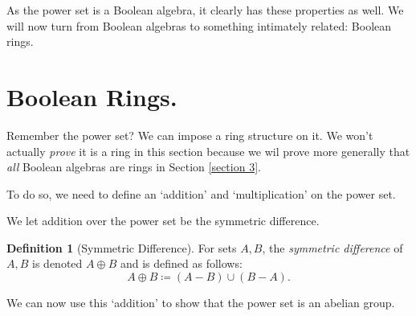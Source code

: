 \documentclass[10pt, letterpaper]{article}
\newcommand{\union}{\cup}
\newcommand{\intersect}{\cap}
\theoremstyle{definition}
\newtheorem{definition}{Definition}[section]
\begin{document}
As the power set is a Boolean algebra, it clearly has these properties as well.
We will now turn from Boolean algebras to something intimately related: Boolean rings.

\section{Boolean Rings.}

Remember the power set? We can impose a ring structure on it. 
We won't actually \textit{prove} it is a ring in this section
because we wil prove more generally that \textit{all} Boolean algebras
are rings in Section \ref{section 3}.

To do so, we need to define an `addition' and `multiplication' on the power set.

We let addition over the power set be the symmetric difference.
\begin{definition}[Symmetric Difference]
	For sets \(A,B\), the \textit{symmetric difference} of \(A,B\)
	is denoted \(A\oplus B\) and is defined as follows:
	\[A\oplus B \coloneqq (A-B)\union(B-A).\]
\iffalse
	We also may use an alternate, but equivalent, definition:
	\[A\oplus B = A\union B - A\intersect B.\]
	These are identical. 
\fi
\iffalse
	\(x\in A\union B - A\intersect B 
	\iff x\in A\union B, x\notin A\intersect B
	\iff (x\in A\text{ or } x\in B)\text{ and }(x\notin A\text{ or }x\notin B)\).
	If \(x\in A\), then \(x\notin B\), since \(x\notin A\) would be a contradiction.
	Then \(x\in A-B\implies x\in (A-B)\union (B-A)\). A similar argument when \(x\in B\) results in the same conclusion.
	Similarly, \(y\in (A-B)\union(B-A)\) has two cases. 
	If \(y\in A-B\), then \(y\in A\implies y\in A\union B\), and \(y\notin B\implies y\notin A\intersect B\). So \(y\in A\union B-A\intersect B\). The same conclusion occurs if \(y\in B-A\).
\fi
\end{definition}

\iffalse
We can now use this `addition' to show that the power set is an abelian group.
\end{document}
